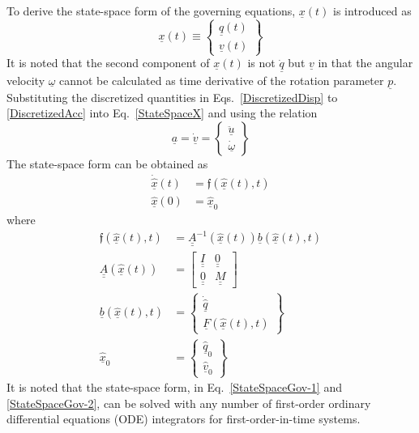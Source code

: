 \documentclass{aiaa-tc}
\newcommand{\tens}[1]{\underline{\underline{#1}}}
\renewcommand{\vec}[1]{\underline{#1}}
\begin{document}
To derive the state-space form of the governing equations,  $\vec{x}(t)$ is introduced as
\begin{equation}
    \label{StateSpaceX}
    \vec{x}(t) \equiv \begin{Bmatrix}
    \vec{q}(t) \\
    \vec{v}(t)
    \end{Bmatrix} 
\end{equation}
It is noted that the second component of $\vec{x}(t)$ is not $\vec{\dot{q}}$ but $\vec{v}$ in that the angular velocity $\vec{\omega}$ cannot be calculated as time derivative of the rotation parameter $\vec{p}$. Substituting the discretized quantities in Eqs.~\eqref{DiscretizedDisp} to \eqref{DiscretizedAcc} into Eq.~\eqref{StateSpaceX} and using the relation
\begin{equation}
    \label{AccVel}
    \vec{a} = \vec{\dot{v}} = \begin{Bmatrix}
    \vec{\ddot{u}} \\
    \vec{\dot{\omega}}
    \end{Bmatrix}
\end{equation}
The state-space form can be obtained as
\begin{align}
    \label{StateSpaceGov-1}
    \dot{\hat{\vec{x}}}(t) &= \mathfrak{f}(\hat{\vec{x}}(t),t) \\
    \label{StateSpaceGov-2}
    \hat{\vec{x}}(0) &= \hat{\vec{x}}_0
\end{align}
where
\begin{align}
    \label{StateSpaceGov-3}
    \mathfrak{f}(\hat{\vec{x}}(t),t) &= \tens{A}^{-1} (\hat{\vec{x}}(t)) \vec{b}(\hat{\vec{x}}(t),t) \\
    \label{StateSpaceGov-4}
    \tens{A} (\hat{\vec{x}}(t)) &= \begin{bmatrix}
    \tens{I} & \tens{0} \\
    \tens{0} & \tens{M}
    \end{bmatrix}  \\
    \label{StateSpaceGov-5}
    \vec{b}(\hat{\vec{x}}(t),t) &= \begin{Bmatrix}
    \dot{\hat{\vec{q}}} \\
    \vec{F}(\hat{\vec{x}}(t),t)
    \end{Bmatrix} \\
    \label{StateSpaceGov-6}
    \hat{\vec{x}}_0 &= \begin{Bmatrix}
    \hat{\vec{q}}_0 \\
    \hat{\vec{v}}_0
    \end{Bmatrix}
\end{align}
It is noted that the state-space form, in
Eq.~\eqref{StateSpaceGov-1} and \eqref{StateSpaceGov-2}, can be solved with
any number of first-order ordinary differential equations (ODE) integrators
for first-order-in-time systems. 
\end{document}
